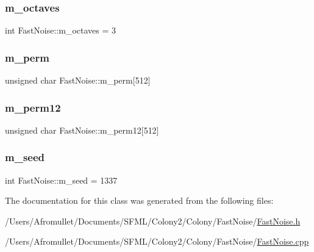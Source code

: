 \subsubsection{\texorpdfstring{m\+\_\+octaves}{m\_octaves}}
{\footnotesize\ttfamily int Fast\+Noise\+::m\+\_\+octaves = 3\hspace{0.3cm}{\ttfamily [private]}}

\mbox{\label{class_fast_noise_a194ef10678fa5c45269611f8878b6a6d}} 
\subsubsection{\texorpdfstring{m\+\_\+perm}{m\_perm}}
{\footnotesize\ttfamily unsigned char Fast\+Noise\+::m\+\_\+perm\mbox{[}512\mbox{]}\hspace{0.3cm}{\ttfamily [private]}}

\mbox{\label{class_fast_noise_a2b8966a5423e3cda086dbdb049f5d67a}} 
\subsubsection{\texorpdfstring{m\+\_\+perm12}{m\_perm12}}
{\footnotesize\ttfamily unsigned char Fast\+Noise\+::m\+\_\+perm12\mbox{[}512\mbox{]}\hspace{0.3cm}{\ttfamily [private]}}

\mbox{\label{class_fast_noise_a9a631ec0853f7b93df07c1e7f1d6e4f0}} 
\subsubsection{\texorpdfstring{m\+\_\+seed}{m\_seed}}
{\footnotesize\ttfamily int Fast\+Noise\+::m\+\_\+seed = 1337\hspace{0.3cm}{\ttfamily [private]}}



The documentation for this class was generated from the following files\+:\begin{DoxyCompactItemize}
\item 
/\+Users/\+Afromullet/\+Documents/\+S\+F\+M\+L/\+Colony2/\+Colony/\+Fast\+Noise/\mbox{\hyperlink{_fast_noise_8h}{Fast\+Noise.\+h}}\item 
/\+Users/\+Afromullet/\+Documents/\+S\+F\+M\+L/\+Colony2/\+Colony/\+Fast\+Noise/\mbox{\hyperlink{_fast_noise_8cpp}{Fast\+Noise.\+cpp}}\end{DoxyCompactItemize}
